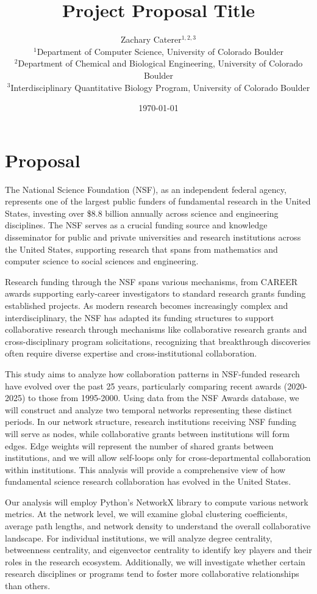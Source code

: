 \documentclass[10pt,twocolumn]{article}
\title{\textbf{Project Proposal Title}}
\author{
    Zachary Caterer$^{1,2,3}$ \\
    \small $^1$Department of Computer Science, University of Colorado Boulder \\
    \small $^2$Department of Chemical and Biological Engineering, University of Colorado Boulder \\
    \small $^3$Interdisciplinary Quantitative Biology Program, University of Colorado Boulder
}
\date{\today}
\begin{document}
\maketitle

\section*{Proposal}

The National Science Foundation (NSF), as an independent federal agency, represents one of the largest public funders of fundamental research in the United States, investing over \$8.8 billion annually across science and engineering disciplines. The NSF serves as a crucial funding source and knowledge disseminator for public and private universities and research institutions across the United States, supporting research that spans from mathematics and computer science to social sciences and engineering.

Research funding through the NSF spans various mechanisms, from CAREER awards supporting early-career investigators to standard research grants funding established projects. As modern research becomes increasingly complex and interdisciplinary, the NSF has adapted its funding structures to support collaborative research through mechanisms like collaborative research grants and cross-disciplinary program solicitations, recognizing that breakthrough discoveries often require diverse expertise and cross-institutional collaboration.

This study aims to analyze how collaboration patterns in NSF-funded research have evolved over the past 25 years, particularly comparing recent awards (2020-2025) to those from 1995-2000. Using data from the NSF Awards database, we will construct and analyze two temporal networks representing these distinct periods. In our network structure, research institutions receiving NSF funding will serve as nodes, while collaborative grants between institutions will form edges. Edge weights will represent the number of shared grants between institutions, and we will allow self-loops only for cross-departmental collaboration within institutions. This analysis will provide a comprehensive view of how fundamental science research collaboration has evolved in the United States.

Our analysis will employ Python's NetworkX library to compute various network metrics. At the network level, we will examine global clustering coefficients, average path lengths, and network density to understand the overall collaborative landscape. For individual institutions, we will analyze degree centrality, betweenness centrality, and eigenvector centrality to identify key players and their roles in the research ecosystem. Additionally, we will investigate whether certain research disciplines or programs tend to foster more collaborative relationships than others.
\end{document}
